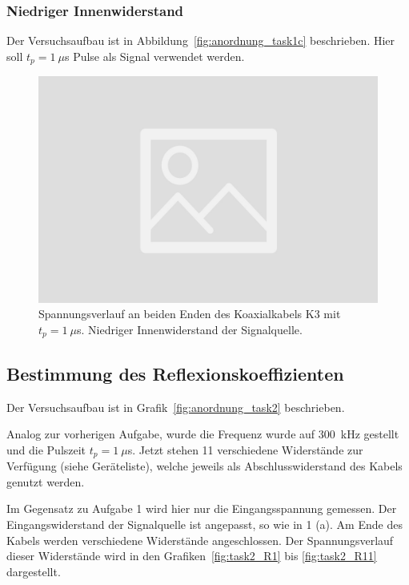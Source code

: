 \documentclass{article}
\begin{document}
\subsubsection{Niedriger Innenwiderstand}
Der Versuchsaufbau ist in Abbildung~\ref{fig:anordnung_task1c} beschrieben. Hier soll $t_p = 1~\mu$s Pulse als Signal verwendet werden.


\begin{figure}[H]
\centering
\caption{Spannungsverlauf an beiden Enden des  Koaxialkabels K3 mit $t_p= 1~\mu$s. Niedriger Innenwiderstand der Signalquelle.}
\label{fig:task1c}
\includegraphics[scale=0.1]{bilder/task1a/leer.jpg}
\end{figure}


\subsection{Bestimmung des Reflexionskoeffizienten}

Der Versuchsaufbau ist in Grafik~\ref{fig:anordnung_task2} beschrieben.

Analog zur vorherigen Aufgabe, wurde die Frequenz wurde auf 300~kHz gestellt und die Pulszeit $t_p = 1~\mu$s. Jetzt stehen 11 verschiedene Widerstände zur Verfügung (siehe Geräteliste), welche jeweils als Abschlusswiderstand des Kabels genutzt werden.

Im Gegensatz zu Aufgabe 1 wird hier nur die Eingangsspannung gemessen. Der Eingangswiderstand der Signalquelle ist angepasst, so wie in 1 (a). Am Ende des Kabels werden verschiedene Widerstände angeschlossen. Der Spannungsverlauf dieser Widerstände wird in den Grafiken~\ref{fig:task2_R1} bis \ref{fig:task2_R11} dargestellt.
\end{document}
